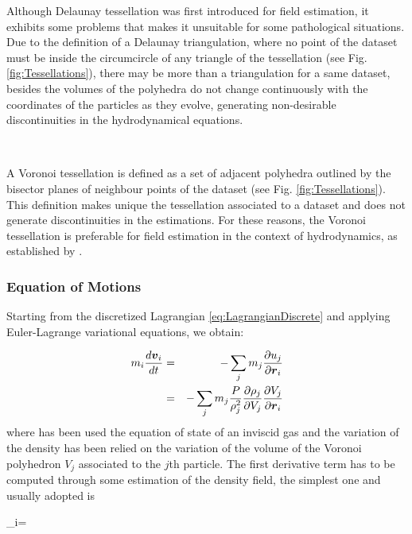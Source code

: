 \documentclass[a4,useAMS,usenatbib,usegraphicx,12pt]{article}
\begin{document}
Although Delaunay tessellation was first introduced for field estimation, it 
exhibits some problems that makes it unsuitable for some pathological 
situations. Due to the definition of a Delaunay triangulation, where no point 
of the dataset must be inside the circumcircle of any triangle of the 
tessellation (see Fig. \ref{fig:Tessellations}), there may be more than a 
triangulation for a same dataset, besides the volumes of the polyhedra do not 
change continuously with the coordinates of the particles as they evolve, 
generating non-desirable discontinuities in the hydrodynamical equations.

\

A Voronoi tessellation is defined as a set of adjacent polyhedra outlined by
the bisector planes of neighbour points of the dataset (see Fig. 
\ref{fig:Tessellations}). This definition makes unique the tessellation 
associated to a dataset and does not generate discontinuities in the 
estimations. For these reasons, the Voronoi tessellation is preferable for 
field estimation in the context of hydrodynamics, as established by 
\citet{Hess10}.


\subsubsection*{Equation of Motions}

Starting from the discretized Lagrangian \ref{eq:LagrangianDiscrete} and 
applying Euler-Lagrange variational equations, we obtain:

\begin{eqnarray}
\nonumber{}
m_i \frac{d \boldsymbol{ v }_i}{dt} &=& - \sum_j m_j \frac{\partial u_j}{\partial \boldsymbol{ r }_i} \\
\label{eq:VPHLarangian}
&=& -\sum_j m_j \frac{P}{\rho_j^2}\frac{\partial \rho_j}{\partial V_j}\frac{\partial V_j}{\partial \boldsymbol{ r }_i}
\end{eqnarray}
where has been used the equation of state of an inviscid gas and the variation
of the density has been relied on the variation of the volume of the Voronoi 
polyhedron $V_j$ associated to the $j$th particle. The first derivative term has 
to be computed through some estimation of the density field, the simplest one and 
usually adopted is 

{ \rho_i=  }
\end{document}

